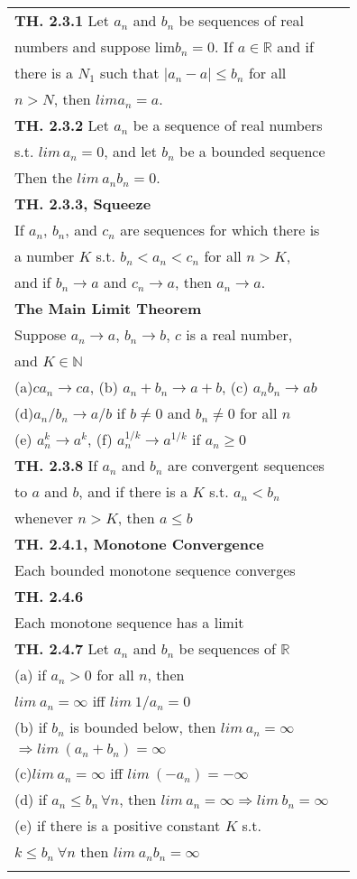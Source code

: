 \documentclass[10 pt,landscape]{article}
\begin{document}
\begin{multicols}{4}
\begin{tabular}{@{}ll@{}}
\textbf{TH. 2.3.1} Let $a_n$ and $b_n$ be sequences of real\\ numbers and suppose lim$b_n=0$. If $a \in \mathbb{R}$ and if \\ there is a $N_1$ such that $|a_n-a|\leq b_n$ for all\\ $n>N$,  then $lima_n=a.$\\
\textbf{TH. 2.3.2} Let $a_n$ be a sequence of real numbers\\ s.t. $lim\,a_n=0$, and let $b_n$ be a bounded sequence\\ Then the $lim\:a_nb_n=0.$\\
\textbf{TH. 2.3.3, Squeeze}\\
If $a_n$, $b_n$, and $c_n$ are sequences for which there is \\a number $K$ s.t. $b_n<a_n<c_n$ for all $n>K$, \\and if
$b_n\rightarrow a$ and $c_n\rightarrow a$, then $a_n\rightarrow a$.\\
\textbf{The Main Limit Theorem}\\
Suppose $a_n\rightarrow a$, $b_n\rightarrow b$, $c$ is a real number,\\ and $K \in \mathbb{N}$\\
(a)$ca_n\rightarrow ca$, (b) $a_n +b_n \rightarrow a+b$, (c) $a_nb_n\rightarrow ab$\\
(d)$a_n/b_n\rightarrow a/b$ if $b\ne 0$ and $b_n\ne 0$ for all $n$\\
(e) $a_n^k \rightarrow a^k$, (f) $a_n^{1/k} \rightarrow a^{1/k}$ if $a_n\geq 0$\\
\textbf{TH. 2.3.8} If $a_n$ and $b_n$ are convergent sequences \\to $a$ and $b$, and if there is a $K$ s.t. $a_n<b_n$\\ whenever $n>K$,  then $a\leq b$\\
\textbf{TH. 2.4.1, Monotone Convergence} \\Each bounded monotone sequence converges\\
\textbf{TH. 2.4.6} \\Each monotone sequence has a limit\\
\textbf{TH. 2.4.7} Let $a_n$ and $b_n$ be sequences of $\mathbb{R}$\\
(a) if $a_n>0$ for all $n$, then\\ $lim\:a_n=\infty $ iff $lim\:1/a_n=0$\\
(b) if $b_n$ is bounded below, then $lim\:a_n=\infty$ \\$\Rightarrow lim\: (a_n+b_n)=\infty$\\
(c)$lim\:a_n=\infty$ iff $lim\:(-a_n)=-\infty$\\
(d) if $a_n\leq b_n \, \forall n$, then $lim\:a_n=\infty \Rightarrow lim\:b_n=\infty$\\
(e) if there is a positive constant $K$ s.t. \\ $k\leq b_n \ \forall n$
then $lim\:a_nb_n=\infty$\\
\\
\end{tabular}



\end{multicols}
\end{document}
